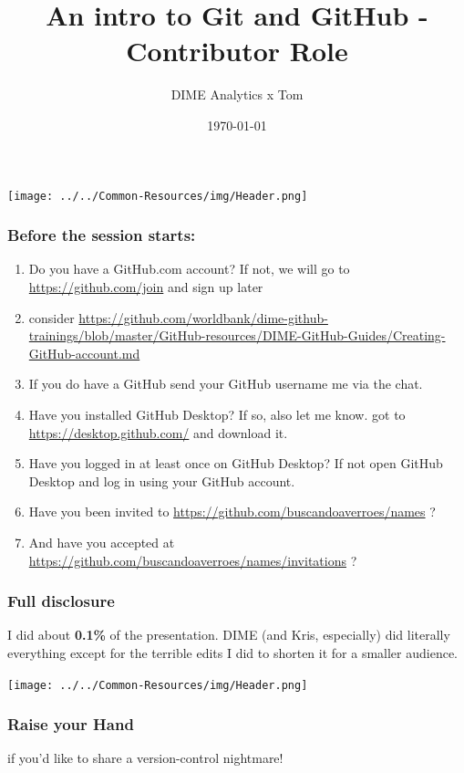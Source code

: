 \documentclass[aspectratio=169]{beamer} %
\title{An intro to Git and GitHub - Contributor Role}
\author{DIME Analytics x Tom}
\institute{DIME - The World Bank - \trainingURL{https://www.worldbank.org/en/research/dime}}
\date{\today}
\newcommand{\trainingURL}[1]{{\color{blue}\url{#1}}}
\newcommand{\traininerUsername}{buscandoaverroes}
\newcommand{\repoName}{\traininerUsername/names}
\newcommand{\trainingRepoURL}[1]{\trainingURL{https://github.com/\repoName #1}}
\begin{document}
\begin{frame}
\texttt{[image: ../../Common-Resources/img/Header.png]}
\vspace{-0.2cm}
\titlepage 	 %
\end{frame}

\begin{frame}
\frametitle{Before the session starts:}
	\begin{enumerate}
		\item Do you have a GitHub.com account? If not, we will go to \trainingURL{https://github.com/join} and sign up later
		\item consider \url{https://github.com/worldbank/dime-github-trainings/blob/master/GitHub-resources/DIME-GitHub-Guides/Creating-GitHub-account.md}
		\item If you do have a GitHub send your GitHub username me via the chat.
		\item Have you installed GitHub Desktop? If so, also let me know. got to \trainingURL{https://desktop.github.com/} and download it.
		\item Have you logged in at least once on GitHub Desktop? If not open GitHub Desktop and log in using your GitHub account.
		\item Have you been invited to \trainingRepoURL{} ?
		\item And have you accepted at \trainingRepoURL{/invitations} ?
	\end{enumerate}

\end{frame}

\begin{frame}
\frametitle{Full disclosure}

	I did about \textbf{0.1\%} of the presentation. DIME (and Kris, especially) did literally everything
	except for the terrible edits I did to shorten it for a smaller audience.


\end{frame}


\begin{frame}
\texttt{[image: ../../Common-Resources/img/Header.png]}
\vspace{-0.2cm}
\titlepage 	 %
\end{frame}

\begin{frame}
	\frametitle{Raise your Hand}

	\small if you'd like to share a version-control nightmare!

\end{frame}
\end{document}
